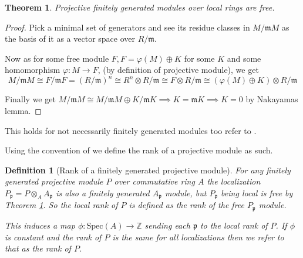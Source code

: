 \documentclass[12pt]{report}
\numberwithin{equation}{section}
\newcommand{\Z}{\mathbb{Z}}
\newcounter{dummy} \numberwithin{dummy}{section}
\newtheorem{theorem}[dummy]{Theorem}
\newtheorem{definition}[dummy]{Definition}
\begin{document}
	\begin{theorem}\label{a2}Projective finitely generated modules over local rings are free.
	\end{theorem}
	\begin{proof}
		Pick a minimal set of generators and see its residue classes in $M/\mathfrak{m}M$ as the basis of it as a vector space over $R/\mathfrak{m}$.
		
		Now as for some free module $F, F=\varphi(M)\oplus K$ for some $K$ and some homomorphism $\varphi: M \to F$, (by definition of projective module), 	we get \[ M/\mathfrak{m}M \cong 	F/\mathfrak{m}F = (R/\mathfrak{m})^n\cong R^n\otimes R/\mathfrak{m} \cong F \otimes R/\mathfrak{m} \cong (\varphi(M)\oplus K) \otimes R/\mathfrak{m}\]
		
		Finally we get $M/\mathfrak{m}M \cong M/\mathfrak{m}M \oplus K/\mathfrak{m}K\implies K=\mathfrak{m}K \implies K=0$ by Nakayamas lemma.
	\end{proof}
	This holds for not necessarily finitely generated modules too refer to \cite[Theorem~2.5]{matsumura_1987}	.
	
	Using the convention of \cite{lam1999lectures} we define the rank of a projective module as such.
	\begin{definition}[Rank of a finitely generated projective module]\label{def:rankproj}
		For any finitely generated projective module $P$ over commutative ring $A$ the localization $P_\mathfrak{p} =P \otimes_A A_\mathfrak{p}$ is also a finitely generated $A_\mathfrak{p}$ module, but $P_\mathfrak{p}$ being local is free by Theorem \ref{a2}. So the local rank of $P$ is defined as the rank of the free $P_\mathfrak{p} $ module.
		
		This induces a map $\phi: \mathrm{Spec}(A) \to \Z $ sending each $\mathfrak{p}$ to the local rank of $P$. If $\phi $ is constant and the rank of $P$ is the same for all localizations then we refer to that as the rank of $P$.
	\end{definition}
	
\end{document}
